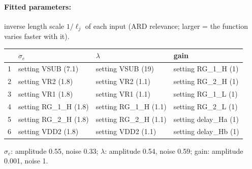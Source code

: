 \paragraph{Fitted parameters:} inverse length scale $1/\ell_j$ of each input (ARD relevance; larger = the function varies faster with it).
\begin{center}\footnotesize
\begin{tabular}{rp{}p{}p{}}
\toprule
 & $\sigma_e$ & $\lambda$ & gain \\
\midrule
1 & setting VSUB (7.1) & setting VSUB (19) & setting RG\_1\_H (1) \\
2 & setting VR2 (1.8) & setting VR2 (1.1) & setting RG\_2\_H (1) \\
3 & setting VR1 (1.8) & setting VR1 (1.1) & setting RG\_1\_L (1) \\
4 & setting RG\_1\_H (1.8) & setting RG\_1\_H (1.1) & setting RG\_2\_L (1) \\
5 & setting RG\_2\_H (1.8) & setting RG\_2\_H (1.1) & setting delay\_Ha (1) \\
6 & setting VDD2 (1.8) & setting VDD2 (1.1) & setting delay\_Hb (1) \\
\bottomrule
\end{tabular}
\end{center}
{\footnotesize $\sigma_e$: amplitude 0.55, noise 0.33; $\lambda$: amplitude 0.54, noise 0.59; gain: amplitude 0.001, noise 1.}

